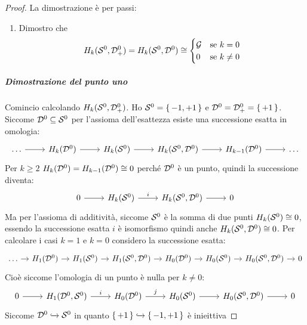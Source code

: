 \begin{proof}
  La dimostrazione è per passi:
  \begin{enumerate}
  \item Dimostro che
    \[
      H_k(\mathcal{S}^{0}, \mathcal{D}^{0}_+) = H_k(\mathcal{S}^{0}, \mathcal{D}^{0}) \cong
      \begin{cases}
        \mathcal{G} & \text{se $ k = 0 $} \\
        0 & \text{se $ k \not = 0 $}
      \end{cases}
    \]
  \end{enumerate}

  \subparagraph{Dimostrazione del punto uno}
  Comincio calcolando $ H_k(\mathcal{S}^{0}, \mathcal{D}^{0}_+) $.
  Ho $ \mathcal{S}^{0} = \set{-1, +1} $ e $ \mathcal{D}^{0} = \mathcal{D}^{0}_+ = \set{+ 1} $.
  Siccome $ \mathcal{D}^{0} \subseteq \mathcal{S}^{0} $ per l'assioma dell'esattezza esiste
  una successione esatta in omologia:
  \[
    \begin{tikzcd}
      \dots \rar & H_k(\Disk{0}) \rar & H_k(\Sph{0}) \rar & H_k(\Sph{0}, \Disk{0}) \rar & H_{k-1}(\Disk{0}) \rar & \dots
    \end{tikzcd}
  \]
  Per $ k \geq 2 $ $ H_k(\mathcal{D}^{0}) = H_{k-1}(\mathcal{D}^{0}) \cong 0 $ perché $ \mathcal{D}^{0} $ è un punto, quindi
  la successione diventa:
  \[
    \begin{tikzcd}
      0 \rar & H_k(\Sph{0}) \rar{i} & H_k(\Sph{0}, \Disk{0}) \rar{} & 0
    \end{tikzcd}
  \]
  Ma per l'assioma di additività, siccome $ \mathcal{S}^{0} $ è la somma di due punti
  $ H_k(\mathcal{S}^{0}) \cong 0 $, essendo la successione esatta
  $ i $ è isomorfismo quindi anche $ H_k(\mathcal{S}^{0}, \mathcal{D}^{0}) \cong 0 $.
  Per calcolare
  i casi $ k = 1 $ e $ k = 0 $ considero la successione esatta:
  \[
    \begin{tikzcd}[nodes={column sep=10pt, inner sep=4pt}]
      \dots \rar & H_1(\Disk{0}) \rar & H_1(\Sph{0}) \rar & H_1(\Sph{0}, \Disk{0}) \rar
      & H_0(\Disk{0}) \rar & H_{0}(\Sph{0}) \rar & H_0(\Sph{0}, \Disk{0}) \rar & 0
    \end{tikzcd}
  \]
  Cioè siccome l'omologia di un punto è nulla per $ k \not = 0 $:
  \[
    \begin{tikzcd}
       0 \rar & H_1(\Disk{0}, \Sph{0}) \rar{i}
      & H_0(\Disk{0}) \rar{j} & H_{0}(\Sph{0}) \rar & H_0(\Sph{0}, \Disk{0}) \rar & 0
    \end{tikzcd}
  \]
  Siccome $ \mathcal{D}^{0} \xhookrightarrow{} \mathcal{S}^{0} $ in quanto $ \set{+1} \xhookrightarrow{} \set{-1, +1} $ è inieittiva

\end{proof}
